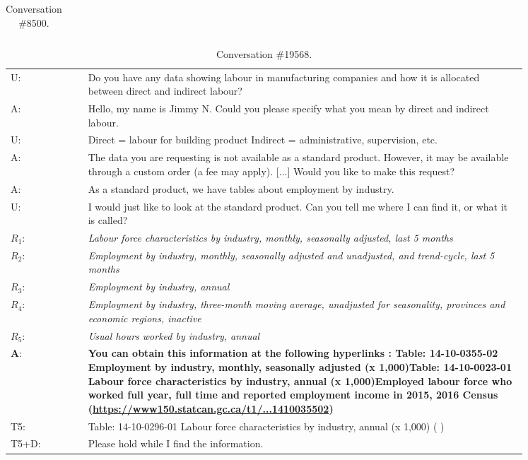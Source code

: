 \documentclass[11pt]{article}
\begin{document}
\begin{table*}[h]
\begin{tabular}{l p{0.85\linewidth}}
    \\
    \bottomrule
    \end{tabular}
    \caption{Conversation \#8500.}
    \label{tab:sample_conversation_8500}
\end{table*}

\begin{table*}[h]
    \small
    \centering
    \begin{tabular}{l p{0.85\linewidth}}
        \toprule
        U: & Do you have any data showing labour in manufacturing companies and how it is allocated between direct and indirect labour? 
        \\
        A: & Hello, my name is Jimmy N. Could you please specify what you mean by direct and indirect labour. 
        \\
        U: & Direct = labour for building product Indirect = administrative, supervision, etc. 
        \\
        A: & The data you are requesting is not available as a standard product. However, it may be available through a custom order (a fee may apply). [...] Would you like to make this request? 
        \\
        A: & As a standard product, we have tables about employment by industry.
        \\
        U: & I would just like to look at the standard product. Can you tell me where I can find it, or what it is called?\
        \\
        $R_1$: & \textit{Labour force characteristics by industry, monthly, seasonally adjusted, last 5 months}
        \\
        $R_2$: & \textit{Employment by industry, monthly, seasonally adjusted and unadjusted, and trend-cycle, last 5 months}
        \\
        $R_3$: & \textit{Employment by industry, annual}
        \\
        $R_4$: & \textit{Employment by industry, three-month moving average, unadjusted for seasonality, provinces and economic regions, inactive}
        \\
        $R_5$: & \textit{Usual hours worked by industry, annual}
        \\
        \midrule
        \textbf{A}: & \textbf{You can obtain this information at the following hyperlinks : Table: 14-10-0355-02 Employment by industry, monthly, seasonally adjusted (x 1,000)Table: 14-10-0023-01 Labour force characteristics by industry, annual (x 1,000)Employed labour force who worked full year, full time and reported employment income in 2015, 2016 Census (\href{https://www150.statcan.gc.ca/t1/tbl1/en/tv.action?pid=1410035502}{https://www150.statcan.gc.ca/t1/...1410035502})}
        \\
        T5: & Table: 14-10-0296-01 Labour force characteristics by industry, annual (x 1,000) ( )
        \\
        T5+D: & Please hold while I find the information.
        \\
        \bottomrule
    \end{tabular}
    \caption{Conversation \#19568.}
    \label{tab:sample_conversation_19568}
\end{table*}
\end{document}
